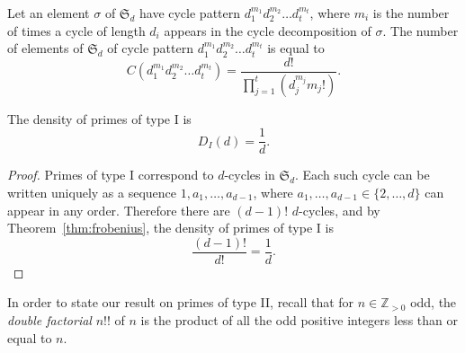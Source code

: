 \documentclass{book}
\newcommand{\ZZ}{\mathbb{Z}}
\renewcommand{\SS}{\mathfrak{S}}
\begin{document}
\begin{lemma}\label{lem:cycletype}
  Let an element $\sigma$ of $\SS_d$ have cycle pattern $d_1^{m_1}d_2^{m_2}\ldots d_t^{m_t}$, 
  where $m_i$ is the number of times a cycle of length $d_i$ appears in the cycle
  decomposition of $\sigma$. 
  The number
   of elements of $\SS_d$ of cycle pattern $d_1^{m_1}d_2^{m_2}\ldots d_t^{m_t}$ is equal to
  \begin{equation*}
    C(d_1^{m_1}d_2^{m_2}\ldots d_t^{m_t})=\frac{d!}{\prod_{j=1}^t\left(d_j^{m_j}m_j!\right)}.
  \end{equation*}
\end{lemma}


\begin{proposition}\label{prop:type1}
  The density of primes of type I is 
  \begin{equation*}
    D_I(d)=\frac{1}{d}.
  \end{equation*}
\end{proposition}
\begin{proof}
  Primes of type I correspond to $d$-cycles in $\SS_d$.  Each such cycle can
  be written uniquely as a sequence $1,a_1,\ldots,a_{d-1}$, where
  $a_1,\ldots,a_{d-1}\in\{2,\ldots,d\}$ can appear in any order.  Therefore
  there are $(d-1)!$ $d$-cycles, and by Theorem~\ref{thm:frobenius},
  the density of primes of type I is
  \begin{equation*}
    \frac{(d-1)!}{d!}=\frac{1}{d}.
  \end{equation*}
\end{proof}

In order to state our result on primes of type II, recall that
for $n\in\ZZ_{>0}$ odd, the \emph{double factorial} $n!!$ of $n$ is
the product of all the odd positive integers less than or equal to $n$.
\end{document}
